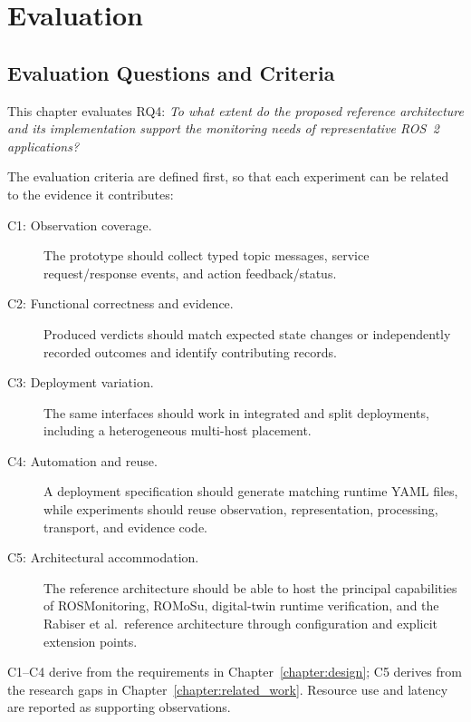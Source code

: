\chapter{Evaluation}\label{chapter:evaluation}

\section{Evaluation Questions and Criteria}

This chapter evaluates RQ4: \emph{To what extent do the proposed reference
architecture and its implementation support the monitoring needs of
representative ROS~2 applications?}

The evaluation criteria are defined first, so that each experiment can be
related to the evidence it contributes:

\begin{description}
  \item[C1: Observation coverage.] The prototype should collect typed topic
  messages, service request/response events, and action feedback/status.

  \item[C2: Functional correctness and evidence.] Produced verdicts should
  match expected state changes or independently recorded outcomes and identify
  contributing records.

  \item[C3: Deployment variation.] The same interfaces should work in
  integrated and split deployments, including a heterogeneous multi-host
  placement.

  \item[C4: Automation and reuse.] A deployment specification should
  generate matching runtime YAML files, while experiments should reuse
  observation, representation, processing, transport, and evidence code.

  \item[C5: Architectural accommodation.] The reference architecture should
  be able to host the principal capabilities of ROSMonitoring, ROMoSu,
  digital-twin runtime verification, and the Rabiser et al.\ reference
  architecture through configuration and explicit extension points.
\end{description}

C1--C4 derive from the requirements in Chapter~\ref{chapter:design}; C5
derives from the research gaps in Chapter~\ref{chapter:related_work}. Resource
use and latency are reported as supporting observations.

